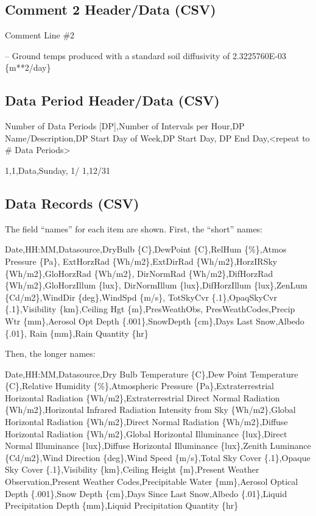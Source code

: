 \subsection{Comment 2 Header/Data (CSV)}\label{comment-2-headerdata-csv}

Comment Line \#2

-- Ground temps produced with a standard soil diffusivity of 2.3225760E-03 \{m**2/day\}

\subsection{Data Period Header/Data (CSV)}\label{data-period-headerdata-csv}

Number of Data Periods {[}DP{]},Number of Intervals per Hour,DP Name/Description,DP Start Day of Week,DP Start Day, DP End Day,\textless{}repeat to \# Data Periods\textgreater{}

1,1,Data,Sunday, 1/ 1,12/31

\subsection{Data Records (CSV)}\label{data-records-csv}

The field ``names'' for each item are shown. First, the ``short'' names:

Date,HH:MM,Datasource,DryBulb \{C\},DewPoint \{C\},RelHum \{\%\},Atmos Pressure \{Pa\}, ExtHorzRad \{Wh/m2\},ExtDirRad \{Wh/m2\},HorzIRSky \{Wh/m2\},GloHorzRad \{Wh/m2\}, DirNormRad \{Wh/m2\},DifHorzRad \{Wh/m2\},GloHorzIllum \{lux\}, DirNormIllum \{lux\},DifHorzIllum \{lux\},ZenLum \{Cd/m2\},WindDir \{deg\},WindSpd \{m/s\}, TotSkyCvr \{.1\},OpaqSkyCvr \{.1\},Visibility \{km\},Ceiling Hgt \{m\},PresWeathObs, PresWeathCodes,Precip Wtr \{mm\},Aerosol Opt Depth \{.001\},SnowDepth \{cm\},Days Last Snow,Albedo \{.01\}, Rain \{mm\},Rain Quantity \{hr\}

Then, the longer names:

Date,HH:MM,Datasource,Dry Bulb Temperature \{C\},Dew Point Temperature \{C\},Relative Humidity \{\%\},Atmospheric Pressure \{Pa\},Extraterrestrial Horizontal Radiation \{Wh/m2\},Extraterrestrial Direct Normal Radiation \{Wh/m2\},Horizontal Infrared Radiation Intensity from Sky \{Wh/m2\},Global Horizontal Radiation \{Wh/m2\},Direct Normal Radiation \{Wh/m2\},Diffuse Horizontal Radiation \{Wh/m2\},Global Horizontal Illuminance \{lux\},Direct Normal Illuminance \{lux\},Diffuse Horizontal Illuminance \{lux\},Zenith Luminance \{Cd/m2\},Wind Direction \{deg\},Wind Speed \{m/s\},Total Sky Cover \{.1\},Opaque Sky Cover \{.1\},Visibility \{km\},Ceiling Height \{m\},Present Weather Observation,Present Weather Codes,Precipitable Water \{mm\},Aerosol Optical Depth \{.001\},Snow Depth \{cm\},Days Since Last Snow,Albedo \{.01\},Liquid Precipitation Depth \{mm\},Liquid Precipitation Quantity \{hr\}

